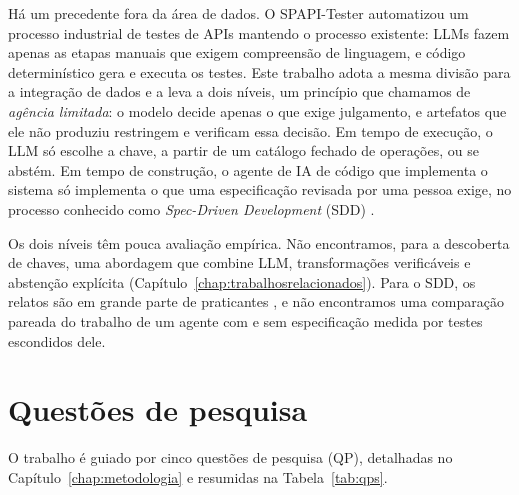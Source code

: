 Há um precedente fora da área de dados. O SPAPI-Tester
\cite{wang2025spapi} automatizou um processo industrial de testes de APIs
mantendo o processo existente: LLMs fazem apenas as etapas manuais que exigem
compreensão de linguagem, e código determinístico gera e executa os testes.
Este trabalho adota a mesma divisão para a integração de dados e a leva a
dois níveis, um princípio que chamamos de \emph{agência limitada}: o modelo
decide apenas o que exige julgamento, e artefatos que ele não produziu
restringem e verificam essa decisão. Em tempo de execução, o LLM só escolhe a
chave, a partir de um catálogo fechado de operações, ou se abstém. Em tempo de
construção, o agente de IA de código que implementa o sistema só implementa
o que uma especificação revisada por uma pessoa exige, no processo conhecido
como \emph{Spec-Driven Development} (SDD) \cite{speckit,bockeler2025sdd}.

Os dois níveis têm pouca avaliação empírica. Não encontramos, para a
descoberta de chaves, uma abordagem que combine LLM, transformações
verificáveis e abstenção explícita (Capítulo~\ref{chap:trabalhosrelacionados}).
Para o SDD, os relatos são em grande parte de praticantes
\cite{agarwal2026sdd}, e não encontramos uma comparação pareada do trabalho de
um agente com e sem especificação medida por testes escondidos dele.

\section{Questões de pesquisa}
\label{sec:introducao-questoes-de-pesquisa}

O trabalho é guiado por cinco questões de pesquisa (QP), detalhadas no
Capítulo~\ref{chap:metodologia} e resumidas na Tabela~\ref{tab:qps}.

